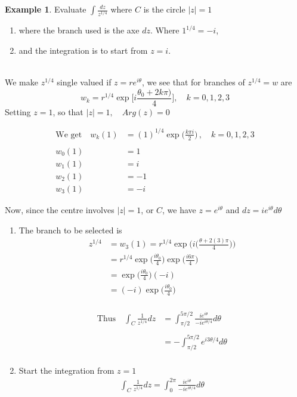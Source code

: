 \documentclass[11pt,a4paper]{article}
\theoremstyle{definition}
\newtheorem{example}[thm]{Example}
\begin{document}
\begin{example}
Evaluate $\displaystyle{\int \frac{dz}{z^{1/4}}}$ where $C$ is the circle $\left|z\right| = 1$
\begin{enumerate}
\item where the branch used is the axe $dz$. Where $1^{1/4} = -i$,
\item and the integration is to start from $z = i$.\\
\end{enumerate}




\text{\textcolor{red}{Working}}\\
We make $z^{1/4}$ single valued if $z = re^{i\theta}$, we see that for branches of $z^{1/4} = w$ are $$ w_k = r^{1/4}\exp \Bigg[i\frac{\theta_0 + 2k\pi)}{4} \Bigg],\quad  k = 0, 1, 2, 3$$
Setting $z= 1$, so that $\left|z\right| = 1,\quad  Arg(z) = 0$

\begin{align*}
\text{We get}\quad  w_k(1) & = (1)^{1/4}\exp \Bigg(\frac{k\pi i}{2}\Bigg)\, , \quad  k = 0, 1, 2, 3\\\\
w_0(1) & = 1\\
w_1(1) & = i\\
w_2(1) & = -1\\
w_3(1) & = -i
\end{align*}

Now, since the centre involves $\left|z\right|  = 1$, or $C$, we have $z = e^{i\theta}$ and $dz = ie^{i\theta}d\theta$
\begin{enumerate}
\item The branch to be selected is 
\begin{align*}
z^{1/4}  & = w_3(1) = r^{1/4} \exp \Bigg(i\Bigg(\frac{\theta + 2(3)\pi}{4}\Bigg)\Bigg)\\
& = r^{1/4} \exp\Big(\frac{i\theta_0}{4}\Big) \exp\Big(\frac{i6\pi}{4}\Big)\\
& = \exp \Big(\frac{i\theta_0}{4}\Big)(-i)\\
& = (-i)\exp \Big(\frac{i\theta_0}{4}\Big)\\
\end{align*}


\begin{align*}
\text{Thus}\quad  \int_C \frac{1}{z^{1/4}}dz  & = \int_{\pi/2}^{5\pi/2}\frac{i e^{i\theta}}{-ie^{i\theta/4}}d\theta\\\\
& = - \int_{\pi/2}^{5\pi/2} e^{i3\theta/4}d\theta\\
\end{align*}




\item Start the integration from $z = 1$
\begin{align*}
\int_C \frac{1}{z^{1/4}}dz = \int^{2\pi}_0 \frac{i e^{i\theta}}{-ie^{i\theta/4}}d\theta\\
\end{align*}
\end{enumerate}
\end{example}
\end{document}
